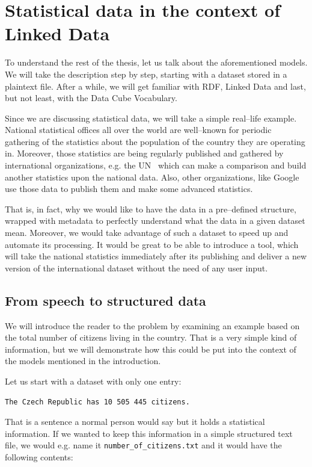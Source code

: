 \chapter{Statistical data in the context of Linked Data}
\label{ch:statistical-data}
To understand the rest of the thesis, let us talk about the aforementioned models.
We will take the description step by step, starting with a dataset stored in a plaintext file.
After a while, we will get familiar with RDF, Linked Data and last, but not least, with the
Data Cube Vocabulary.

Since we are discussing statistical data, we will take a simple real--life example.
National statistical offices all over the world are well--known for periodic gathering of the
statistics about the population of the country they are operating in. Moreover, 
those statistics are being regularly published and gathered by international 
organizations, e.g. the UN~\cite{un} which can make a comparison and build 
another statistics upon the national data. Also, other organizations, like 
Google~\cite{pubdata} use those data to publish them and make 
some advanced statistics.

That is, in fact, why we would like to have the data in a pre--defined structure,
wrapped with metadata to perfectly understand what the data in a given 
dataset mean. Moreover, we would take advantage of such a dataset to speed up 
and automate its processing. It would be great to be able to introduce a tool, 
which will take the national statistics immediately after its publishing and 
deliver a new version of the international dataset without the need of any user 
input.

\section{From speech to structured data}

We will introduce the reader to the problem by examining an example based on the total number of
citizens living in the country. That is a very simple kind of information, but we will demonstrate
how this could be put into the context of the models mentioned in the introduction.

Let us start with a dataset with only one entry:

\begin{verbatim}
The Czech Republic has 10 505 445 citizens.
\end{verbatim}

That is a sentence a normal person would say but it holds a statistical information.
If we wanted to keep this information in a simple structured text file, we would e.g. name it
\texttt{number\_of\_citizens.txt} and it would have the following contents:


